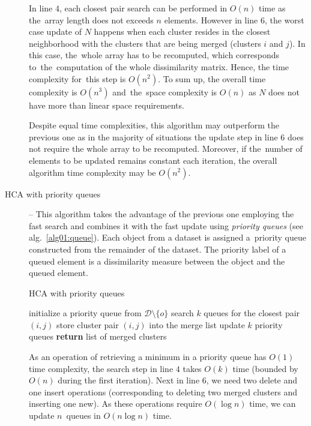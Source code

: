 \begin{description}
	
	 In line $4$, each closest pair search can be performed in $O(n)$ time as the~array length does not exceeds $n$ elements. However in line $6$, the worst case update of $N$ happens when each cluster resides in the closest neighborhood with the clusters that are being merged (clusters $i$  and $j$). In this case, the~whole array has to be recomputed, which corresponds to~the~computation of the whole dissimilarity matrix. Hence, the time complexity for~this step is $O(n^2)$. To sum up, the overall time complexity is $O(n^3)$ and~the~space complexity is $O(n)$ as $N$ does not have more than linear space requirements.
	 
	 \begin{rem}
	 	Despite equal time complexities, this algorithm may outperform the previous one as in the majority of situations the update step in line $6$ does not require the whole array to be recomputed. Moreover, if the~number of elements to be updated remains constant each iteration, the overall algorithm time complexity may be $O(n^2)$. 
	 \end{rem}
	 
	 \item[HCA with priority queues] -- This algorithm takes the advantage of the previous one employing the fast search and combines it with the fast update using \emph{priority queues} (see alg.~\ref{alg01:queue}).
	 Each object from a dataset is assigned a~priority queue constructed from the remainder of the dataset. The priority label of a queued element is a dissimilarity measure between the object and the queued element. 
	 
	 \begin{algorithm}
	 	\caption{HCA with priority queues}
	 	\label{alg01:queue}
	 	\begin{algorithmic}[1]
	 		\State initialize a priority queue from $\mathcal{D} \setminus \{o\}$
	 		\EndFor
	 		\State search $k$ queues for the closest pair $(i,j)$ 
	 		\State store cluster pair $(i,j)$ into the merge list 
	 		\State update $k$ priority queues 
	 		\EndFor
	 		\State \textbf{return} list of merged clusters
	 		\EndProcedure
	 	\end{algorithmic}
	 \end{algorithm}
 
 	
 	As an operation of retrieving a minimum in a priority queue has $O(1)$ time complexity, the search step in line $4$ takes $O(k)$ time (bounded by~$O(n)$ during the first iteration). Next in line $6$, we need two delete and one insert operations (corresponding to deleting two merged clusters and inserting one new). As these operations require $O(\log{n})$ time, we can update $n$~queues in $O(n\log{n})$ time.
 	

\end{description}
